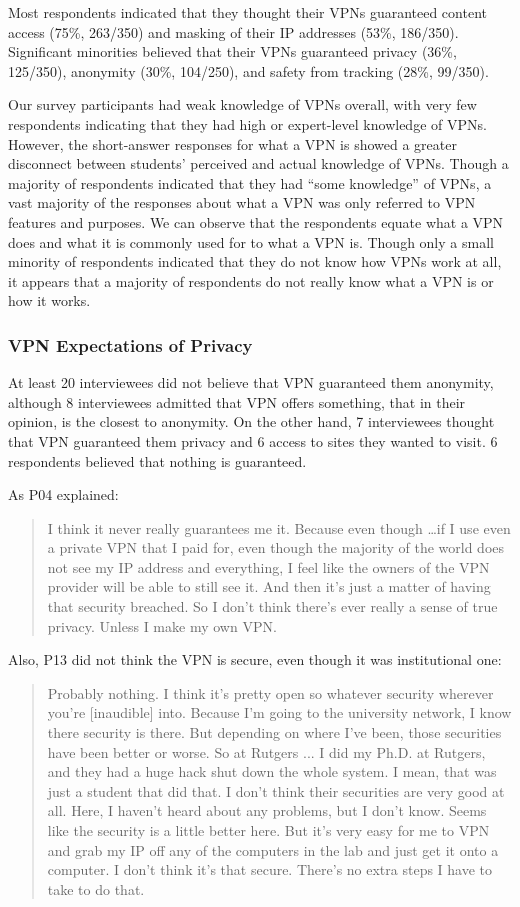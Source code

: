 Most respondents indicated that they thought their VPNs guaranteed content access (75\%, 263/350) and masking of their IP addresses (53\%, 186/350). Significant minorities believed that their VPNs guaranteed privacy (36\%, 125/350), anonymity (30\%, 104/250), and safety from tracking (28\%, 99/350).

Our survey participants had weak knowledge of VPNs overall, with very few respondents indicating that they had high or expert-level knowledge of VPNs. However, the short-answer responses for what a VPN is showed a greater disconnect between students’ perceived and actual knowledge of VPNs. Though a majority of respondents indicated that they had “some knowledge” of VPNs, a vast majority of the responses about what a VPN was only referred to VPN features and purposes. We can observe that the respondents equate what a VPN does and what it is commonly used for to what a VPN is. Though only a small minority of respondents indicated that they do not know how VPNs work at all, it appears that a majority of respondents do not really know what a VPN is or how it works.


\subsubsection{VPN Expectations of Privacy}
At least 20 interviewees did not believe that VPN guaranteed them anonymity, although 8 interviewees admitted that VPN offers something, that in their opinion, is the closest to anonymity. On the other hand, 7 interviewees thought that VPN guaranteed them privacy and 6 access to sites they wanted to visit. 6 respondents believed that nothing is guaranteed.

As P04 explained:
\begin{quote}I think it never really guarantees me it. Because even though \dots if I use even a private VPN that I paid for, even though the majority of the world does not see my IP address and everything, I feel like the owners of the VPN provider will be able to still see it. And then it's just a matter of having that security breached. So I don't think there's ever really a sense of true privacy. Unless I make my own VPN.\end{quote}


Also, P13 did not think the VPN is secure, even though it was institutional one:
\begin{quote}Probably nothing. I think it's pretty open so whatever security wherever you're [inaudible] into. Because I'm going to the university network, I know there security is there. But depending on where I've been, those securities have been better or worse. So at Rutgers ... I did my Ph.D. at Rutgers, and they had a huge hack shut down the whole system. I mean, that was just a student that did that. I don't think their securities are very good at all. Here, I haven't heard about any problems, but I don't know. Seems like the security is a little better here. But it's very easy for me to VPN and grab my IP off any of the computers in the lab and just get it onto a computer. I don't think it's that secure. There's no extra steps I have to take to do that.\end{quote}


